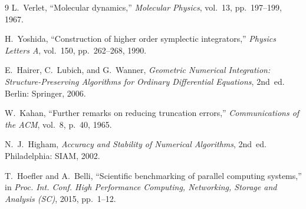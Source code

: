 \documentclass[conference]{IEEEtran}
\begin{document}
\begin{thebibliography}{9}
L.~Verlet, ``Molecular dynamics,'' \emph{Molecular Physics}, vol.~13,
pp.~197--199, 1967.

H.~Yoshida, ``Construction of higher order symplectic integrators,''
\emph{Physics Letters A}, vol.~150, pp.~262--268, 1990.

E.~Hairer, C.~Lubich, and G.~Wanner, \emph{Geometric Numerical Integration:
Structure-Preserving Algorithms for Ordinary Differential Equations}, 2nd~ed.
Berlin: Springer, 2006.

W.~Kahan, ``Further remarks on reducing truncation errors,'' \emph{Communications of the ACM}, vol.~8, p.~40, 1965.

N.~J.~Higham, \emph{Accuracy and Stability of Numerical Algorithms}, 2nd~ed.
Philadelphia: SIAM, 2002.

T.~Hoefler and A.~Belli, ``Scientific benchmarking of parallel computing
systems,'' in \emph{Proc. Int. Conf. High Performance Computing, Networking,
Storage and Analysis (SC)}, 2015, pp.~1--12.
\end{thebibliography}
\end{document}
